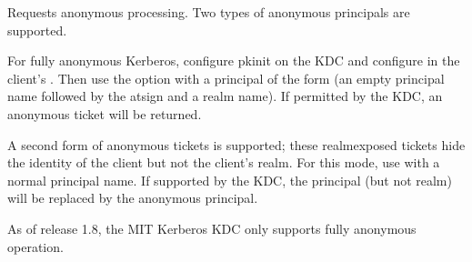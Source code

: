 \documentclass[letterpaper,10pt,english]{sphinxmanual}
\begin{document}
\begin{description}
\sphinxAtStartPar
Requests anonymous processing.  Two types of anonymous principals
are supported.

\sphinxAtStartPar
For fully anonymous Kerberos, configure pkinit on the KDC and
configure  in the client’s .
Then use the  option with a principal of the form 
(an empty principal name followed by the at\sphinxhyphen{}sign and a realm
name).  If permitted by the KDC, an anonymous ticket will be
returned.

\sphinxAtStartPar
A second form of anonymous tickets is supported; these
realm\sphinxhyphen{}exposed tickets hide the identity of the client but not the
client’s realm.  For this mode, use  with a normal
principal name.  If supported by the KDC, the principal (but not
realm) will be replaced by the anonymous principal.

\sphinxAtStartPar
As of release 1.8, the MIT Kerberos KDC only supports fully
anonymous operation.

\end{description}
\end{document}
